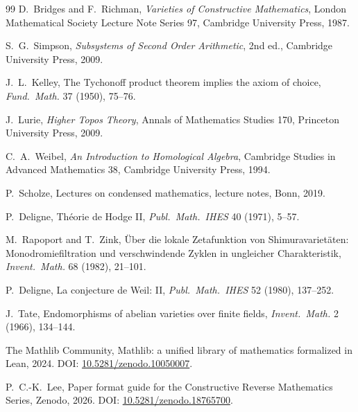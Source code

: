 \documentclass[11pt,a4paper]{article}
\theoremstyle{plain}
\theoremstyle{definition}
\begin{document}
\begin{thebibliography}{99}
 D.\ Bridges and F.\ Richman, \emph{Varieties of Constructive Mathematics}, London Mathematical Society Lecture Note Series 97, Cambridge University Press, 1987.

 S.\ G.\ Simpson, \emph{Subsystems of Second Order Arithmetic}, 2nd ed., Cambridge University Press, 2009.

 J.\ L.\ Kelley, The Tychonoff product theorem implies the axiom of choice, \emph{Fund.\ Math.} 37 (1950), 75--76.

 J.\ Lurie, \emph{Higher Topos Theory}, Annals of Mathematics Studies 170, Princeton University Press, 2009.

 C.\ A.\ Weibel, \emph{An Introduction to Homological Algebra}, Cambridge Studies in Advanced Mathematics 38, Cambridge University Press, 1994.

 P.\ Scholze, Lectures on condensed mathematics, lecture notes, Bonn, 2019.

 P.\ Deligne, Th\'eorie de Hodge II, \emph{Publ.\ Math.\ IHES} 40 (1971), 5--57.

 M.\ Rapoport and T.\ Zink, \"Uber die lokale Zetafunktion von Shimuravariet\"aten: Monodromiefiltration und verschwindende Zyklen in ungleicher Charakteristik, \emph{Invent.\ Math.} 68 (1982), 21--101.

 P.\ Deligne, La conjecture de Weil: II, \emph{Publ.\ Math.\ IHES} 52 (1980), 137--252.

 J.\ Tate, Endomorphisms of abelian varieties over finite fields, \emph{Invent.\ Math.} 2 (1966), 134--144.

 The Mathlib Community, Mathlib: a unified library of mathematics formalized in Lean, 2024. DOI: \href{https://doi.org/10.5281/zenodo.10050007}{10.5281/zenodo.10050007}.

 P.\ C.-K.\ Lee, Paper format guide for the Constructive Reverse Mathematics Series, Zenodo, 2026. DOI: \href{https://doi.org/10.5281/zenodo.18765700}{10.5281/zenodo.18765700}.

\end{thebibliography}
\end{document}
